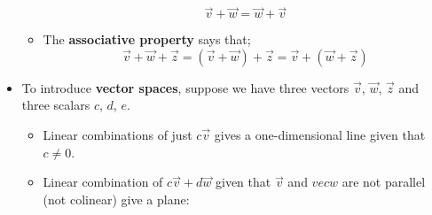 \begin{itemize}
\begin{itemize}
            \begin{equation}
                \vec{v}+\vec{w}=\vec{w}+\vec{v}
                \label{eq:}
            \end{equation}
            \item The \textbf{associative property} says that;
            \begin{equation}
                \vec{v}+\vec{w}+\vec{z}=(\vec{v}+\vec{w})+\vec{z}=\vec{v}+(\vec{w}+\vec{z})
                \label{eq:}
            \end{equation}
            
        \end{itemize}
    \item To introduce \textbf{vector spaces}, suppose we have three vectors $\vec{v}$, $\vec{w}$, $\vec{z}$ and three scalars $c$, $d$, $e$.
    \begin{itemize}
        \item Linear combinations of just $c\vec{v}$ gives a one-dimensional line given that $c\neq 0$.
        \begin{center}
        \end{center}
        \item Linear combination of $c\vec{v}+d\vec{w}$ given that $\vec{v}$ and $vec{w}$ are not parallel (not colinear) give a plane:
        \begin{center}
\end{center}
\end{itemize}
\end{itemize}
